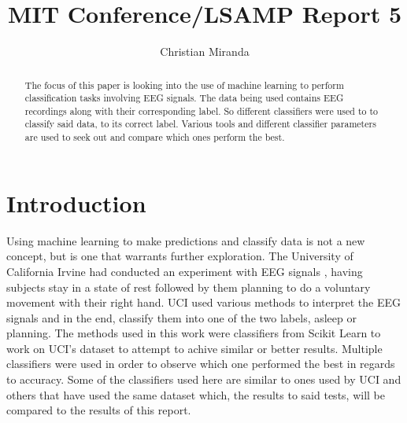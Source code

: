 \documentclass{report}
\begin{document}
\author{Christian Miranda}
\title{MIT Conference/LSAMP Report 5}
\maketitle

\begin{abstract}
The focus of this paper is looking into the use of machine learning to perform classification tasks involving EEG signals.
The data being used contains EEG recordings along with their corresponding label. So different classifiers were used to 
to classify said data, to its correct label. Various tools and different classifier parameters are used to seek 
out and compare which ones perform the best. 
\end{abstract}

\section{Introduction}
Using machine learning to make predictions and classify data is not a new concept, but is one that warrants further exploration. 
The University of California Irvine had conducted an experiment with EEG signals \cite{classsvm}, having subjects stay in a state of rest followed by them planning to do a voluntary movement with their right hand. 
UCI used various methods to interpret the EEG signals and 
in the end, classify them into one of the two labels, asleep or planning. The methods used in this work were classifiers from 
Scikit Learn to work on UCI's dataset to attempt to achive similar or better results. Multiple classifiers were used in order to observe which one performed the best in regards 
to accuracy. Some of the classifiers used here are similar to ones used by UCI and others that have used the same dataset \cite{fuzzy} which, the results to said tests, will be compared to the results of this report.
\end{document}
